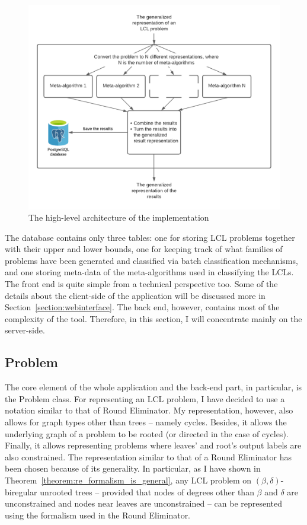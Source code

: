 \begin{figure}[ht]
  \begin{center}
    \includegraphics[width=\textwidth]{images/tool-architecture.pdf}
    \caption{The high-level architecture of the implementation}
    \label{fig:implementation-architecture}
  \end{center}
\end{figure}

The database contains only three tables: one for
storing LCL problems together with their upper and
lower bounds, one for keeping track of what families of
problems have been generated and classified via batch
classification mechanisms, and one storing meta-data
of the meta-algorithms used in classifying the LCLs.
The front end is quite simple from a technical perspective
too. Some of the details about the client-side of the
application will be discussed more in Section~\ref{section:webinterface}.
The back end, however, contains most of the complexity of
the tool. Therefore, in this section, I will concentrate
mainly on the server-side.

\subsection{Problem}

The core element of the whole application and the
back-end part, in particular, is the Problem class.
For representing an LCL problem, I have decided
to use a notation similar to that of Round
Eliminator. My representation, however, also
allows for graph types other than trees -- namely cycles.
Besides, it allows the underlying graph of a problem
to be rooted (or directed in the case of cycles).
Finally, it allows representing problems where
leaves' and root's output labels are also constrained.
The representation similar to that of a Round
Eliminator has been chosen because of its generality.
In particular, as I have shown in Theorem~\ref{theorem:re_formalism_is_general},
any LCL problem
on $(\beta, \delta)$-biregular unrooted trees -- provided
that nodes of degrees other than $\beta$ and $\delta$ are unconstrained
and nodes near leaves are unconstrained -- can be represented
using the formalism used in the Round Eliminator.

